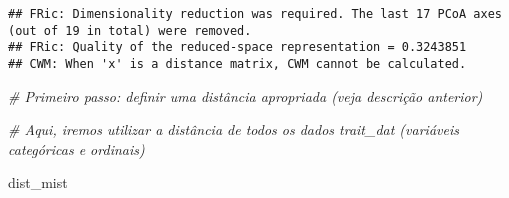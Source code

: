 \documentclass[
]{book}
\newenvironment{Shaded}{\begin{snugshade}}{\end{snugshade}}
\newcommand{\CommentTok}[1]{\textcolor[rgb]{0.56,0.35,0.01}{\textit{#1}}}
\newcommand{\NormalTok}[1]{#1}
\begin{document}
\begin{verbatim}
## FRic: Dimensionality reduction was required. The last 17 PCoA axes (out of 19 in total) were removed. 
## FRic: Quality of the reduced-space representation = 0.3243851 
## CWM: When 'x' is a distance matrix, CWM cannot be calculated.
\end{verbatim}

\begin{Shaded}
\begin{Highlighting}[]
\CommentTok{# Primeiro passo: definir uma distância apropriada (veja descrição anterior)}

\CommentTok{# Aqui, iremos utilizar a distância de todos os dados trait_dat (variáveis categóricas e ordinais)}

\NormalTok{dist_mist}
\end{Highlighting}
\end{Shaded}
\end{document}
